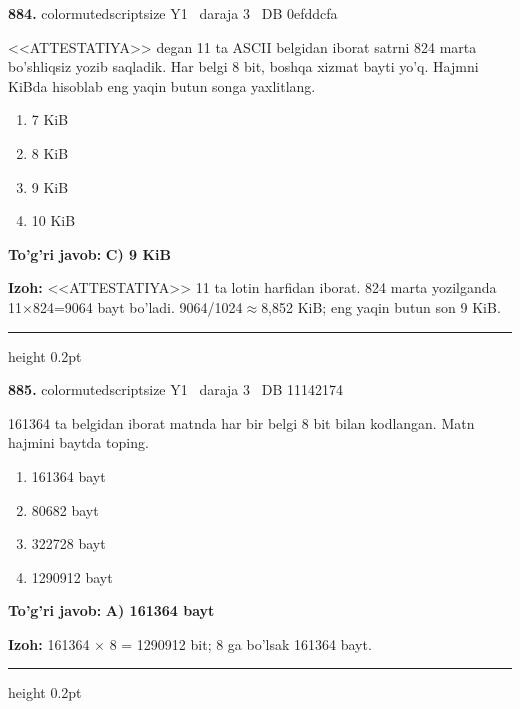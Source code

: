 \documentclass[10pt,a4paper,oneside]{article}
\begin{document}
\noindent\textbf{\color{ink}884.}  {color{muted}scriptsize Y1 \textbullet\ daraja 3 \textbullet\ DB 0efddcfa}
\par
<<ATTESTATIYA>> degan 11 ta ASCII belgidan iborat satrni 824 marta bo'shliqsiz yozib saqladik. Har belgi 8 bit, boshqa xizmat bayti yo'q. Hajmni KiBda hisoblab eng yaqin butun songa yaxlitlang.
\begin{enumerate}[label=\Alph*),leftmargin=9mm]
\item 7 KiB
\item 8 KiB
\item 9 KiB
\item 10 KiB
\end{enumerate}
\begin{tcolorbox}[enhanced,breakable,colback=teal!4,colframe=teal!50!black,boxrule=0.5pt,arc=1.1mm,left=3mm,right=3mm,top=1.7mm,bottom=1.7mm,before skip=2mm,after skip=2mm]
\textbf{\color{teal}To'g'ri javob:} \textbf{C) 9 KiB}
\par\smallskip
\textbf{Izoh:} <<ATTESTATIYA>> 11 ta lotin harfidan iborat. 824 marta yozilganda 11\ensuremath{\times}824=9064 bayt bo'ladi. 9064/1024\ensuremath{\approx}8,852 KiB; eng yaqin butun son 9 KiB.
\end{tcolorbox}
\vspace{2mm}\hrule height 0.2pt \vspace{3mm}

\noindent\textbf{\color{ink}885.}  {color{muted}scriptsize Y1 \textbullet\ daraja 3 \textbullet\ DB 11142174}
\par
161364 ta belgidan iborat matnda har bir belgi 8 bit bilan kodlangan. Matn hajmini baytda toping.
\begin{enumerate}[label=\Alph*),leftmargin=9mm]
\item 161364 bayt
\item 80682 bayt
\item 322728 bayt
\item 1290912 bayt
\end{enumerate}
\begin{tcolorbox}[enhanced,breakable,colback=teal!4,colframe=teal!50!black,boxrule=0.5pt,arc=1.1mm,left=3mm,right=3mm,top=1.7mm,bottom=1.7mm,before skip=2mm,after skip=2mm]
\textbf{\color{teal}To'g'ri javob:} \textbf{A) 161364 bayt}
\par\smallskip
\textbf{Izoh:} 161364 \ensuremath{\times} 8 = 1290912 bit; 8 ga bo'lsak 161364 bayt.
\end{tcolorbox}
\vspace{2mm}\hrule height 0.2pt \vspace{3mm}
\end{document}
